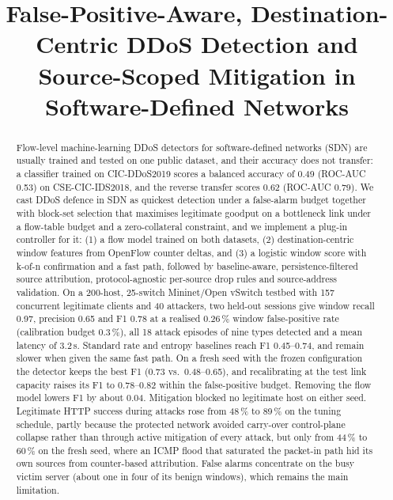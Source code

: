 \documentclass[conference]{IEEEtran}
\begin{document}
\title{False-Positive-Aware, Destination-Centric DDoS Detection and Source-Scoped Mitigation in Software-Defined Networks}

\author{
\and
{}
\and
{}
\and
{}
\and
{}
}

\maketitle

\begin{abstract}
Flow-level machine-learning DDoS detectors for software-defined networks (SDN) are usually trained and tested on one public dataset, and their accuracy does not transfer: a classifier trained on CIC-DDoS2019 scores a balanced accuracy of 0.49 (ROC-AUC 0.53) on CSE-CIC-IDS2018, and the reverse transfer scores 0.62 (ROC-AUC 0.79). We cast DDoS defence in SDN as quickest detection under a false-alarm budget together with block-set selection that maximises legitimate goodput on a bottleneck link under a flow-table budget and a zero-collateral constraint, and we implement a plug-in controller for it: (1) a flow model trained on both datasets, (2) destination-centric window features from OpenFlow counter deltas, and (3) a logistic window score with k-of-n confirmation and a fast path, followed by baseline-aware, persistence-filtered source attribution, protocol-agnostic per-source drop rules and source-address validation. On a 200-host, 25-switch Mininet/Open vSwitch testbed with 157 concurrent legitimate clients and 40 attackers, two held-out sessions give window recall 0.97, precision 0.65 and F1 0.78 at a realised 0.26\,\% window false-positive rate (calibration budget 0.3\,\%), all 18 attack episodes of nine types detected and a mean latency of 3.2\,s. Standard rate and entropy baselines reach F1 0.45--0.74, and remain slower when given the same fast path. On a fresh seed with the frozen configuration the detector keeps the best F1 (0.73 vs.\ 0.48--0.65), and recalibrating at the test link capacity raises its F1 to 0.78--0.82 within the false-positive budget. Removing the flow model lowers F1 by about 0.04. Mitigation blocked no legitimate host on either seed. Legitimate HTTP success during attacks rose from 48\,\% to 89\,\% on the tuning schedule, partly because the protected network avoided carry-over control-plane collapse rather than through active mitigation of every attack, but only from 44\,\% to 60\,\% on the fresh seed, where an ICMP flood that saturated the packet-in path hid its own sources from counter-based attribution. False alarms concentrate on the busy victim server (about one in four of its benign windows), which remains the main limitation.
\end{abstract}
\end{document}
